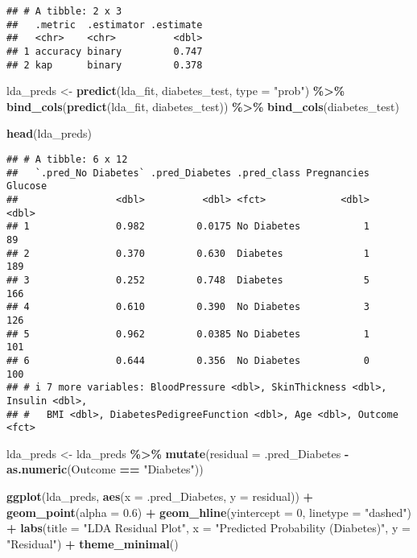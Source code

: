 \documentclass[
]{article}
\newenvironment{Shaded}{\begin{snugshade}}{\end{snugshade}}
\newcommand{\AttributeTok}[1]{\textcolor[rgb]{0.13,0.29,0.53}{#1}}
\newcommand{\DecValTok}[1]{\textcolor[rgb]{0.00,0.00,0.81}{#1}}
\newcommand{\FloatTok}[1]{\textcolor[rgb]{0.00,0.00,0.81}{#1}}
\newcommand{\FunctionTok}[1]{\textcolor[rgb]{0.13,0.29,0.53}{\textbf{#1}}}
\newcommand{\NormalTok}[1]{#1}
\newcommand{\OtherTok}[1]{\textcolor[rgb]{0.56,0.35,0.01}{#1}}
\newcommand{\SpecialCharTok}[1]{\textcolor[rgb]{0.81,0.36,0.00}{\textbf{#1}}}
\newcommand{\StringTok}[1]{\textcolor[rgb]{0.31,0.60,0.02}{#1}}
\begin{document}
\begin{verbatim}
## # A tibble: 2 x 3
##   .metric  .estimator .estimate
##   <chr>    <chr>          <dbl>
## 1 accuracy binary         0.747
## 2 kap      binary         0.378
\end{verbatim}

\begin{Shaded}
\begin{Highlighting}[]
\NormalTok{lda\_preds }\OtherTok{\textless{}{-}} \FunctionTok{predict}\NormalTok{(lda\_fit, diabetes\_test, }\AttributeTok{type =} \StringTok{"prob"}\NormalTok{) }\SpecialCharTok{\%\textgreater{}\%}
  \FunctionTok{bind\_cols}\NormalTok{(}\FunctionTok{predict}\NormalTok{(lda\_fit, diabetes\_test)) }\SpecialCharTok{\%\textgreater{}\%}
  \FunctionTok{bind\_cols}\NormalTok{(diabetes\_test)}

\FunctionTok{head}\NormalTok{(lda\_preds)}
\end{Highlighting}
\end{Shaded}

\begin{verbatim}
## # A tibble: 6 x 12
##   `.pred_No Diabetes` .pred_Diabetes .pred_class Pregnancies Glucose
##                 <dbl>          <dbl> <fct>             <dbl>   <dbl>
## 1               0.982         0.0175 No Diabetes           1      89
## 2               0.370         0.630  Diabetes              1     189
## 3               0.252         0.748  Diabetes              5     166
## 4               0.610         0.390  No Diabetes           3     126
## 5               0.962         0.0385 No Diabetes           1     101
## 6               0.644         0.356  No Diabetes           0     100
## # i 7 more variables: BloodPressure <dbl>, SkinThickness <dbl>, Insulin <dbl>,
## #   BMI <dbl>, DiabetesPedigreeFunction <dbl>, Age <dbl>, Outcome <fct>
\end{verbatim}

\begin{Shaded}
\begin{Highlighting}[]
\NormalTok{lda\_preds }\OtherTok{\textless{}{-}}\NormalTok{ lda\_preds }\SpecialCharTok{\%\textgreater{}\%}
  \FunctionTok{mutate}\NormalTok{(}\AttributeTok{residual =}\NormalTok{ .pred\_Diabetes }\SpecialCharTok{{-}} \FunctionTok{as.numeric}\NormalTok{(Outcome }\SpecialCharTok{==} \StringTok{"Diabetes"}\NormalTok{))}

\FunctionTok{ggplot}\NormalTok{(lda\_preds, }\FunctionTok{aes}\NormalTok{(}\AttributeTok{x =}\NormalTok{ .pred\_Diabetes, }\AttributeTok{y =}\NormalTok{ residual)) }\SpecialCharTok{+}
  \FunctionTok{geom\_point}\NormalTok{(}\AttributeTok{alpha =} \FloatTok{0.6}\NormalTok{) }\SpecialCharTok{+}
  \FunctionTok{geom\_hline}\NormalTok{(}\AttributeTok{yintercept =} \DecValTok{0}\NormalTok{, }\AttributeTok{linetype =} \StringTok{"dashed"}\NormalTok{) }\SpecialCharTok{+}
  \FunctionTok{labs}\NormalTok{(}\AttributeTok{title =} \StringTok{"LDA Residual Plot"}\NormalTok{,}
       \AttributeTok{x =} \StringTok{"Predicted Probability (Diabetes)"}\NormalTok{,}
       \AttributeTok{y =} \StringTok{"Residual"}\NormalTok{) }\SpecialCharTok{+}
  \FunctionTok{theme\_minimal}\NormalTok{()}
\end{Highlighting}
\end{Shaded}
\end{document}
